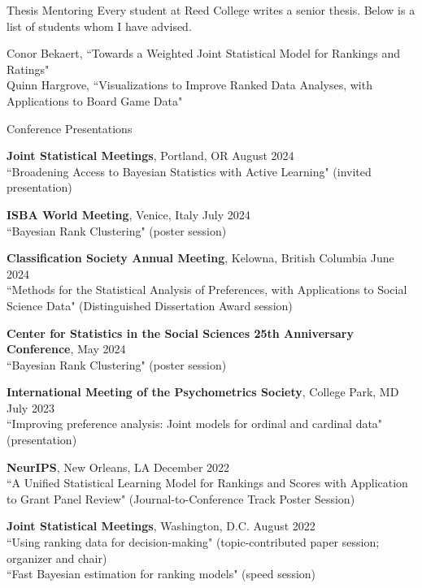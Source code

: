 \documentclass{resume} %
\begin{document}
\begin{rSection}{Thesis Mentoring}
Every student at Reed College writes a senior thesis. Below is a list of students whom I have advised.

Conor Bekaert, ``Towards a Weighted Joint Statistical Model for Rankings and Ratings"
\\ Quinn Hargrove, ``Visualizations to Improve Ranked Data Analyses, with Applications to Board Game Data"

\end{rSection}

\begin{rSection}{Conference Presentations}

\textbf{Joint Statistical Meetings}, Portland, OR \hfill {August 2024}\\
``Broadening Access to Bayesian Statistics with Active Learning" (invited presentation)

\textbf{ISBA World Meeting}, Venice, Italy \hfill {July 2024}\\
``Bayesian Rank Clustering" (poster session)

\textbf{Classification Society Annual Meeting}, Kelowna, British Columbia \hfill{June 2024}\\
``Methods for the Statistical Analysis of Preferences, with Applications to Social Science Data" (Distinguished Dissertation Award session)

\textbf{Center for Statistics in the Social Sciences 25th Anniversary Conference},  \hfill {May 2024}\\
``Bayesian Rank Clustering" (poster session)

\textbf{International Meeting of the Psychometrics Society}, College Park, MD \hfill{July 2023}\\
``Improving preference analysis: Joint models for ordinal and cardinal data" (presentation)

\textbf{NeurIPS}, New Orleans, LA \hfill {December 2022}\\
``A Unified Statistical Learning Model for Rankings and Scores with Application to Grant Panel Review" (Journal-to-Conference Track Poster Session)

\textbf{Joint Statistical Meetings}, Washington, D.C. \hfill {August 2022}\\
``Using ranking data for decision-making" (topic-contributed paper session; organizer and chair)\\
``Fast Bayesian estimation for ranking models" (speed session)


\end{rSection}
\end{document}

